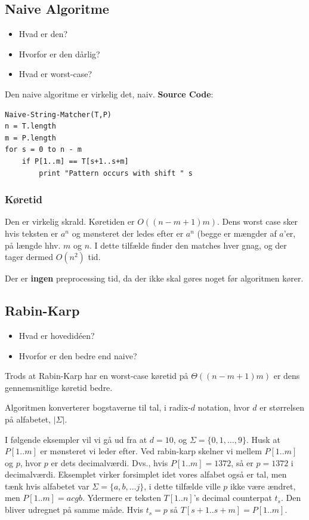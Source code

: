 \documentclass[11pt]{article}
\theoremstyle{definition}
\theoremstyle{remark}
\begin{document}
\subsection{Naive Algoritme}
\label{subsec:naive}

\begin{itemize}
\item Hvad er den? 
\item Hvorfor er den dårlig? 
\item Hvad er worst-case? 
\end{itemize}


Den naive algoritme er virkelig det, naiv.
\textbf{Source Code}:

\begin{verbatim}
Naive-String-Matcher(T,P)
n = T.length
m = P.length
for s = 0 to n - m
    if P[1..m] == T[s+1..s+m]
        print "Pattern occurs with shift " s
\end{verbatim}

\subsubsection{Køretid}

Den er virkelig skrald. Køretiden er $O((n-m+1)m)$. Dens worst case sker hvis teksten er $a^{n}$ og mønsteret der ledes efter er $a^{n}$ (begge er mængder af $a$'er, på længde hhv. $m$ og $n$. I dette tilfælde finder den matches hver gnag, og der tager dermed $O(n^{2})$ tid.

Der er \textbf{ingen} preprocessing tid, da der ikke skal gøres noget før algoritmen kører.



\subsection{Rabin-Karp}
\label{subsec:rabinkarp}

\begin{itemize}
\item Hvad er hovedidéen? 
\item Hvorfor er den bedre end naive? 
\end{itemize}

Trods at Rabin-Karp har en worst-case køretid på $\Theta((n-m+1)m)$ er dens gennemsnitlige køretid bedre.

Algoritmen konverterer bogstaverne til tal, i radix-$d$ notation, hvor $d$ er størrelsen på alfabetet, $|\Sigma|$.

I følgende eksempler vil vi gå ud fra at $d = 10$, og $\Sigma = \{0, 1, \ldots, 9\}$. Husk at $P[1..m]$ er mønsteret vi leder efter. Ved rabin-karp skelner vi mellem $P[1..m]$ og $p$, hvor $p$ er dets decimalværdi. Dvs., hvis $P[1..m] = 1372$, så er $p = 1372$ i decimalværdi. Eksemplet virker forsimplet idet vores alfabet også er tal, men tænk hvis alfabetet var $\Sigma = \{a, b, ... j\}$, i dette tilfælde ville $p$ ikke være ændret, men $P[1..m] = acgb$. Ydermere er teksten $T[1..n]$'s decimal counterpat $t_{s}$. Den bliver udregnet på samme måde. Hvis $t_{s} = p$ så $T[s+1..s+m] = P[1..m]$.
\end{document}

